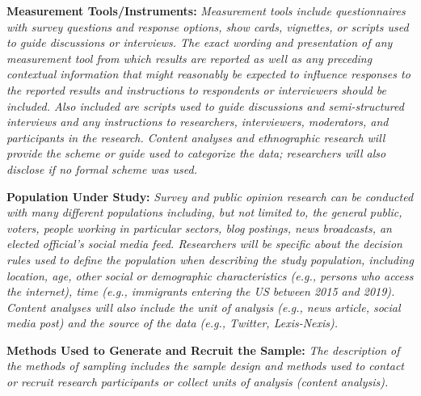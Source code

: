 \documentclass{article}
\begin{document}
\medskip

\textbf{Measurement Tools/Instruments:} \textit{Measurement tools include questionnaires with survey questions and response options, show cards, vignettes, or scripts used to guide discussions or interviews. The exact wording and presentation of any measurement tool from which results are reported as well as any preceding contextual information that might reasonably be expected to influence responses to the reported results and instructions to respondents or interviewers should be included. Also included are scripts used to guide discussions and semi-structured interviews and any instructions to researchers, interviewers, moderators, and participants in the research. Content analyses and ethnographic research will provide the scheme or guide used to categorize the data; researchers will also disclose if no formal scheme was used.}

\medskip

\textbf{Population Under Study:} \textit{Survey and public opinion research can be conducted with many different populations including, but not limited to, the general public, voters, people working in particular sectors, blog postings, news broadcasts, an elected official's social media feed. Researchers will be specific about the decision rules used to define the population when describing the study population, including location, age, other social or demographic characteristics (e.g., persons who access the internet), time (e.g., immigrants entering the US between 2015 and 2019). Content analyses will also include the unit of analysis (e.g., news article, social media post) and the source of the data (e.g., Twitter, Lexis-Nexis).}

\medskip

\textbf{Methods Used to Generate and Recruit the Sample:} \textit{The description of the methods of sampling includes the sample design and methods used to contact or recruit research participants or collect units of analysis (content analysis).}
\end{document}
